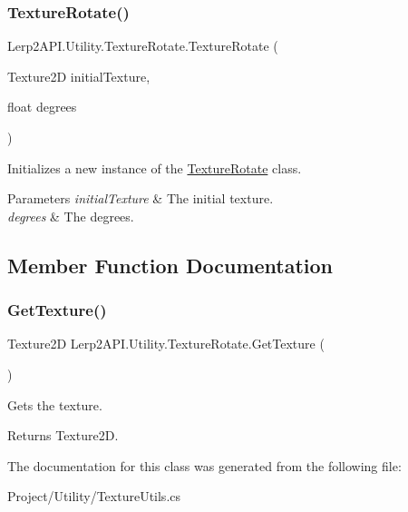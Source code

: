 \subsubsection{\texorpdfstring{Texture\+Rotate()}{TextureRotate()}}
{\footnotesize\ttfamily Lerp2\+A\+P\+I.\+Utility.\+Texture\+Rotate.\+Texture\+Rotate (\begin{DoxyParamCaption}\item[{Texture2D}]{initial\+Texture,  }\item[{float}]{degrees }\end{DoxyParamCaption})\hspace{0.3cm}{\ttfamily [inline]}}



Initializes a new instance of the \hyperlink{class_lerp2_a_p_i_1_1_utility_1_1_texture_rotate}{Texture\+Rotate} class. 


\begin{DoxyParams}{Parameters}
{\em initial\+Texture} & The initial texture.\\
\hline
{\em degrees} & The degrees.\\
\hline
\end{DoxyParams}


\subsection{Member Function Documentation}
\mbox{\label{class_lerp2_a_p_i_1_1_utility_1_1_texture_rotate_af11a3d9639834022dd3fdaadc1bc583e}} 
\subsubsection{\texorpdfstring{Get\+Texture()}{GetTexture()}}
{\footnotesize\ttfamily Texture2D Lerp2\+A\+P\+I.\+Utility.\+Texture\+Rotate.\+Get\+Texture (\begin{DoxyParamCaption}{ }\end{DoxyParamCaption})\hspace{0.3cm}{\ttfamily [inline]}}



Gets the texture. 

\begin{DoxyReturn}{Returns}
Texture2D.
\end{DoxyReturn}


The documentation for this class was generated from the following file\+:\begin{DoxyCompactItemize}
\item 
Project/\+Utility/Texture\+Utils.\+cs\end{DoxyCompactItemize}
